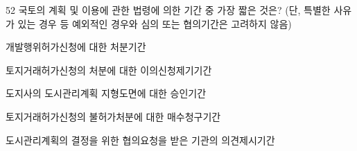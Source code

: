 \begin{question}{52}
국토의 계획 및 이용에 관한 법령에 의한 기간 중 가장 짧은 것은? (단, 특별한 사유가 있는 경우 등 예외적인 경우와 심의 또는 협의기간은 고려하지 않음)
\begin{choices}
  \item 개발행위허가신청에 대한 처분기간
  \item 토지거래허가신청의 처분에 대한 이의신청제기기간
  \item 도지사의 도시관리계획 지형도면에 대한 승인기간
  \item 토지거래허가신청의 불허가처분에 대한 매수청구기간
  \item 도시관리계획의 결정을 위한 협의요청을 받은 기관의 의견제시기간
\end{choices}
\end{question}
